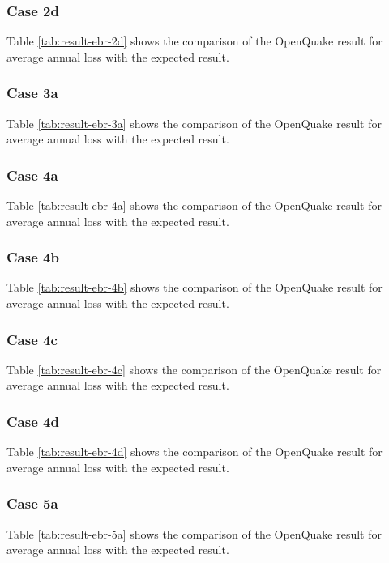 \subsubsection{Case 2d}


Table \ref{tab:result-ebr-2d} shows the comparison of the OpenQuake result for average annual loss with the expected result.

\subsubsection{Case 3a}


Table \ref{tab:result-ebr-3a} shows the comparison of the OpenQuake result for average annual loss with the expected result.

\subsubsection{Case 4a}


Table \ref{tab:result-ebr-4a} shows the comparison of the OpenQuake result for average annual loss with the expected result.

\subsubsection{Case 4b}


Table \ref{tab:result-ebr-4b} shows the comparison of the OpenQuake result for average annual loss with the expected result.

\subsubsection{Case 4c}


Table \ref{tab:result-ebr-4c} shows the comparison of the OpenQuake result for average annual loss with the expected result.

\subsubsection{Case 4d}


Table \ref{tab:result-ebr-4d} shows the comparison of the OpenQuake result for average annual loss with the expected result.

\subsubsection{Case 5a}


Table \ref{tab:result-ebr-5a} shows the comparison of the OpenQuake result for average annual loss with the expected result.

